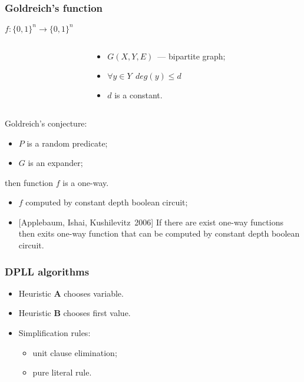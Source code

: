 \begin{frame}
	\frametitle{Goldreich's function}
	$f:\{0, 1\}^n \rightarrow \{0, 1\}^n$

    \pause

    \begin{columns}
    	\begin{column}{5.5cm}
            
        \end{column}

        \pause
        \pause
        \begin{column}{5.5cm}
            \begin{itemize}
	            \item $G(X, Y, E)$~--- bipartite graph;
            	\pause
                \item $\forall y \in Y ~~ deg(y) \le d$
            	\pause
            	\item $d$ is a constant.
            \end{itemize}
        \end{column}
	\end{columns}
    
	\pause

    Goldreich's conjecture:
    \begin{itemize}
	    \item $P$ is a random predicate;
    	\item $G$ is an expander;
    \end{itemize}
    then function $f$ is a one-way.

    \pause
    \begin{itemize}
	    \item $f$ computed by constant depth boolean circuit;
    	\pause
	    \item{} [Applebaum, Ishai, Kushilevitz~2006]  If there are
		    exist one-way functions then exits one-way function that
            can be computed by constant depth boolean circuit.
    \end{itemize}
\end{frame}

\begin{frame}
	\frametitle{DPLL algorithms}

   	
    
	\pause
    \pause
    \pause
    \pause
    \pause
    \begin{itemize}
        \item Heuristic $\mathbf{A}$ chooses variable.
    	\pause
	    \item Heuristic $\mathbf{B}$ chooses first value.
    	\pause
    	\item Simplification rules:
	    \begin{itemize}
            \item unit clause elimination;
        	\item pure literal rule.
    	\end{itemize}
    \end{itemize}

\end{frame}

